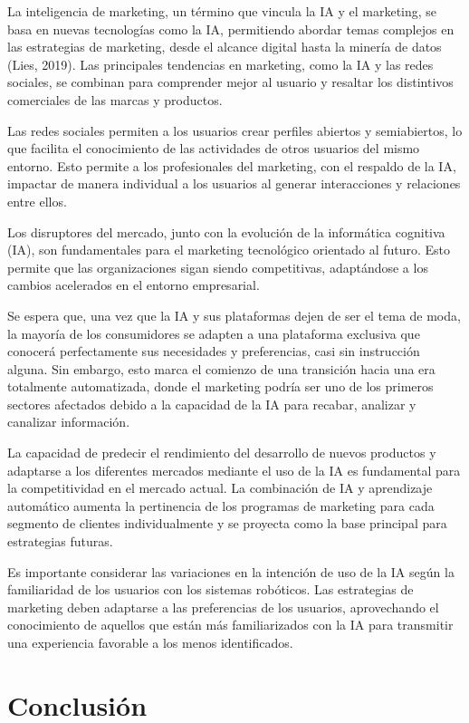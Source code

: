 \documentclass[a4paper, 12pt, twocolumn]{article}
\begin{document}
La inteligencia de marketing, un término que vincula la IA y el marketing, se basa en nuevas tecnologías como la IA, permitiendo abordar temas complejos en las estrategias de marketing, desde el alcance digital hasta la minería de datos (Lies, 2019). Las principales tendencias en marketing, como la IA y las redes sociales, se combinan para comprender mejor al usuario y resaltar los distintivos comerciales de las marcas y productos.

Las redes sociales permiten a los usuarios crear perfiles abiertos y semiabiertos, lo que facilita el conocimiento de las actividades de otros usuarios del mismo entorno. Esto permite a los profesionales del marketing, con el respaldo de la IA, impactar de manera individual a los usuarios al generar interacciones y relaciones entre ellos.

Los disruptores del mercado, junto con la evolución de la informática cognitiva (IA), son fundamentales para el marketing tecnológico orientado al futuro. Esto permite que las organizaciones sigan siendo competitivas, adaptándose a los cambios acelerados en el entorno empresarial.

Se espera que, una vez que la IA y sus plataformas dejen de ser el tema de moda, la mayoría de los consumidores se adapten a una plataforma exclusiva que conocerá perfectamente sus necesidades y preferencias, casi sin instrucción alguna. Sin embargo, esto marca el comienzo de una transición hacia una era totalmente automatizada, donde el marketing podría ser uno de los primeros sectores afectados debido a la capacidad de la IA para recabar, analizar y canalizar información.

La capacidad de predecir el rendimiento del desarrollo de nuevos productos y adaptarse a los diferentes mercados mediante el uso de la IA es fundamental para la competitividad en el mercado actual. La combinación de IA y aprendizaje automático aumenta la pertinencia de los programas de marketing para cada segmento de clientes individualmente y se proyecta como la base principal para estrategias futuras.

Es importante considerar las variaciones en la intención de uso de la IA según la familiaridad de los usuarios con los sistemas robóticos. Las estrategias de marketing deben adaptarse a las preferencias de los usuarios, aprovechando el conocimiento de aquellos que están más familiarizados con la IA para transmitir una experiencia favorable a los menos identificados.

\section{Conclusión}
\end{document}
